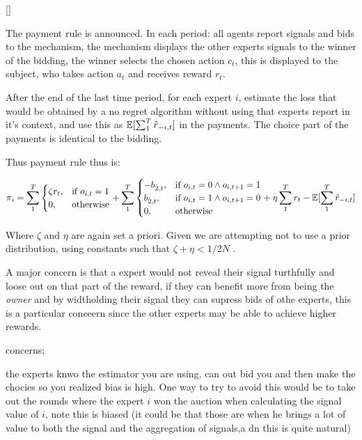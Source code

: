 \begin{mech}\label{mech:bidbandit}[]



The payment rule is announced. In each period: all agents report signals and bids to the mechanism, the mechanism displays the other experts signals to the winner of the bidding, the winner selects the chosen action $c_t$, this is displayed to the subject, who takes action $a_t$ and receives reward $r_t$.

After the end of the last time period, for each expert $i$, estimate the loss that would be obtained by a no regret algorithm without using that experts report in it's context, and use this as $\operatorname*{\mathbb E}[\sum_1^T \hat{r}_{-i,t}]$ in the payments. The choice part of the payments is identical to the bidding.


Thus payment rule thus is:


\[
    \pi_i =  \sum_1^T
\begin{cases}
    \zeta r_t ,& \text{if } o_{i,t} = 1\\
     0,              & \text{otherwise}
\end{cases}
+
\sum_1^T
\begin{cases}
     - b_{\hat{2},t} ,& \text{if } o_{i,t} = 0 \land o_{i,t+1} = 1\\
       b_{\hat{2},t} ,& \text{if } o_{i,t} = 1 \land o_{i,t+1} = 0 \\
	   0,              & \text{otherwise}
\end{cases}
  +  \eta \sum_1^T r_t -  \expec[\sum_1^T \hat{r}_{-i,t}]
\]

 

Where $\zeta$ and $\eta$ are again set a priori. Given we are attempting not to use a prior distribution, using  constants such that  $\zeta + \eta < 1/2N$ .

\end{mech}


\begin{lem}

\end{lem}


 A major concern is that a expert would not reveal their signal turthfully and loose out on that part of the reward, if they can benefit more from being the \emph{owner} and by widtholding their signal they can supress bids of othe experts, this is a particular conceern since the other experts may be able to achieve higher rewards.  



 concerns;

 the experts knwo the estimator you are using, can out bid you and then make the chocies so you realized bias is high. One way to try to avoid this would be to take out the rounds where the expert $i$ won the auction when calculating the signal value of $i$, note this is biased (it could be that those are when he brings a lot of value to both the signal and the aggregation of signals,a dn this is quite natural)


